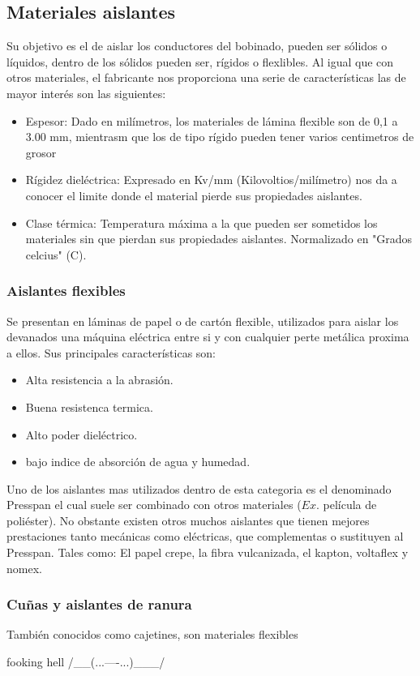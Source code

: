 \documentclass{report}
\begin{document}
    \subsection{Materiales aislantes}\label{ssec:materiales_aislantes}
      Su objetivo es el de aislar los conductores del bobinado, pueden ser sólidos o líquidos, dentro de los sólidos pueden ser,
      rígidos o flexlibles.
      \fspace{1em}
      Al igual que con otros materiales, el fabricante nos proporciona una serie de características las de mayor interés son las siguientes:
      \begin{itemize}

        \item{Espesor:} Dado en milímetros, los materiales de lámina flexible son de 0,1 a 3.00 mm,
          mientrasm que los de tipo rígido pueden tener varios centimetros de grosor

        \item{Rígidez dieléctrica:} Expresado en Kv/mm (Kilovoltios/milímetro) nos da a conocer el limite donde el material pierde
          sus propiedades aislantes.

        \item{Clase térmica:} Temperatura máxima a la que pueden ser sometidos los materiales sin que pierdan sus propiedades 
          aislantes. Normalizado en "Grados celcius" (C).

      \end{itemize}
        \subsubsection{Aislantes flexibles}\label{sssec:aislantes_flexibles}
          Se presentan en láminas de papel o de cartón flexible, utilizados para aislar los devanados una máquina eléctrica
          entre si y con cualquier perte metálica proxima a ellos. Sus principales características son:
          \begin{itemize}
            \item{} Alta resistencia a la abrasión.
            \item{} Buena resistenca termica.
            \item{} Alto poder dieléctrico.
            \item{} bajo indice de absorción de agua y humedad.
          \end{itemize}
          \vspace{1em}
          Uno de los aislantes mas utilizados dentro de esta categoria es el denominado Presspan el cual suele ser combinado con 
          otros materiales ($Ex.$ película de poliéster). No obstante existen otros muchos aislantes que tienen mejores 
          prestaciones tanto mecánicas como eléctricas, que complementas o sustituyen al Presspan. Tales como: 
          El papel crepe, la fibra vulcanizada, el kapton, voltaflex y nomex.

        \subsubsection{Cuñas y aislantes de ranura}\label{sssec:cuñas_y_aislantes_ranura}
          También conocidos como cajetines, son materiales flexibles     

fooking 
hell
/__(...----...)___/
\end{document}
